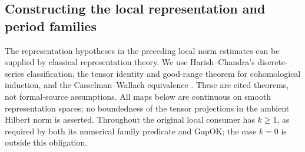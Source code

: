 \subsection{Constructing the local representation and period families}
\label{archimedean-pieri-family}

The representation hypotheses in the preceding local norm estimates
can be supplied by classical representation theory. We use
Harish--Chandra's discrete-series classification, the tensor identity
and good-range theorem for cohomological induction, and the
Casselman--Wallach equivalence
\cite{pieri-family-hks,pieri-family-kv,pieri-family-cw}.
These are cited theorems, not formal-source assumptions.
All maps below are continuous on smooth representation spaces;
no boundedness of the tensor projections in the ambient Hilbert norm
is asserted. Throughout the original local consumer has $k\ge1$,
as required by both its numerical family predicate and
$\mathrm{GapOK}$; the case $k=0$ is outside this obligation.

